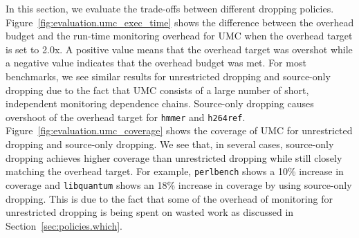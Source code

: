 In this section, we evaluate the trade-offs between different dropping policies.
Figure~\ref{fig:evaluation.umc_exec_time} shows the difference between the
overhead budget and the run-time monitoring overhead for UMC when the overhead target is set to 2.0x. A positive value
means that the overhead target was overshot while a negative value indicates
that the overhead budget was met. For most benchmarks, we see similar results for unrestricted
dropping and source-only dropping due to the fact that UMC consists of a large
number of short, independent monitoring dependence chains. Source-only dropping
causes overshoot of the overhead target for {\tt hmmer} and {\tt h264ref}.
Figure~\ref{fig:evaluation.umc_coverage} shows the coverage of UMC for
unrestricted dropping and source-only dropping. We see that, in several cases, source-only dropping
achieves higher coverage than unrestricted dropping while still closely matching the overhead target. For example, {\tt perlbench} shows a 10\% increase in coverage and {\tt libquantum} shows an 18\% increase in coverage by using source-only dropping. This is due
to the fact that some of the overhead of monitoring for unrestricted dropping
is being spent on wasted work as discussed in Section~\ref{sec:policies.which}.

